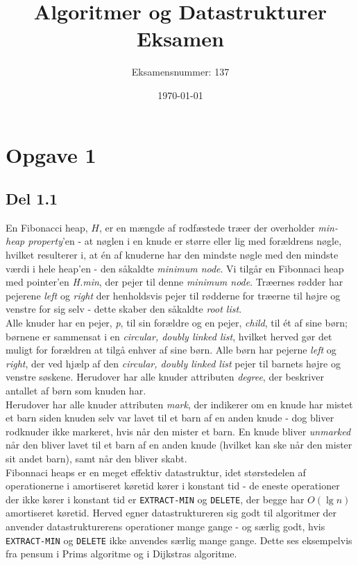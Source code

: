 \documentclass{report}
\title{Algoritmer og Datastrukturer Eksamen}
\author{Eksamensnummer: 137}
\date{\today}
\begin{document}
\maketitle


\section*{Opgave 1}
\subsection*{Del 1.1}
En Fibonacci heap, $H$, er en mængde af rodfæstede træer der overholder \textit{min-heap property}'en - at nøglen i en knude er større eller lig med forældrens nøgle, hvilket resulterer i, at én af knuderne har den mindste nøgle med den mindste værdi i hele heap'en - den såkaldte  \textit{minimum node}. Vi tilgår en Fibonnaci heap med pointer'en \textit{H.min}, der pejer til denne  \textit{minimum node}. Træernes rødder har pejerene \textit{left} og \textit{right} der henholdsvis pejer til rødderne for træerne til højre og venstre for sig selv - dette skaber den såkaldte \textit{root list}. \\
Alle knuder har en pejer, \textit{p}, til sin forældre og en pejer, \textit{child}, til ét af sine børn; børnene er sammensat i en \textit{circular, doubly linked list}, hvilket herved gør det muligt for forældren at tilgå enhver af sine børn. Alle børn har pejerne \textit{left} og \textit{right}, der ved hjælp af den \textit{circular, doubly linked list} pejer til barnets højre og venstre søskene. Herudover har alle knuder attributen \textit{degree}, der beskriver antallet af børn som knuden har. \\
Herudover har alle knuder attributen \textit{mark}, der indikerer om en knude har mistet et barn siden knuden selv var lavet til et barn af en anden knude - dog bliver rodknuder ikke markeret, hvis når den mister et barn. En knude bliver \textit{unmarked} når den bliver lavet til et barn af en anden knude (hvilket kan ske når den mister sit andet barn), samt når den bliver skabt. \\
Fibonnaci heaps er en meget effektiv datastruktur, idet størstedelen af operationerne i amortiseret køretid kører i konstant tid - de eneste operationer der ikke kører i konstant tid er \texttt{EXTRACT-MIN} og \texttt{DELETE}, der begge har $O(\lg n)$ amortiseret køretid. Herved egner datastruktureren sig godt til algoritmer der anvender datastrukturerens operationer mange gange - og særlig godt, hvis \texttt{EXTRACT-MIN} og \texttt{DELETE} ikke anvendes særlig mange gange. Dette ses eksempelvis fra pensum i Prims algoritme og i Dijkstras algoritme. \\
\end{document}
